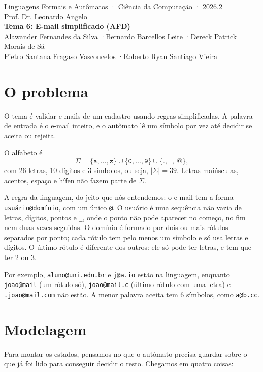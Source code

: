 \documentclass[11pt,a4paper]{article}
\newcommand{\s}[1]{\texttt{#1}}
\begin{document}
\begin{center}
{\small Linguagens Formais e Autômatos · Ciência da Computação · 2026.2}\\[2pt]
{\small Prof. Dr. Leonardo Angelo}\\[10pt]
{\sffamily\LARGE\bfseries Tema 6: E-mail simplificado (AFD)}\\[10pt]
Alawander Fernandes da Silva \quad·\quad Bernardo Barcellos Leite \quad·\quad Dereck Patrick Morais de Sá\\[3pt]
Pietro Santana Fragaso Vasconcelos \quad·\quad Roberto Ryan Santiago Vieira
\end{center}
\vspace{4pt}

\section{O problema}

O tema é validar e-mails de um cadastro usando regras simplificadas. A palavra de entrada é o
e-mail inteiro, e o autômato lê um símbolo por vez até decidir se aceita ou rejeita.

O alfabeto é
\[
\Sigma = \{\s{a},\dots,\s{z}\} \cup \{\s{0},\dots,\s{9}\} \cup \{\s{.},\ \s{\_},\ \s{@}\},
\]
com 26 letras, 10 dígitos e 3 símbolos, ou seja, $|\Sigma| = 39$. Letras maiúsculas, acentos,
espaço e hífen não fazem parte de $\Sigma$.

A regra da linguagem, do jeito que nós entendemos: o e-mail tem a forma \s{usuário@domínio}, com um
único \s{@}. O usuário é uma sequência não vazia de letras, dígitos, pontos e \s{\_}, onde o ponto
não pode aparecer no começo, no fim nem duas vezes seguidas. O domínio é formado por dois ou mais
rótulos separados por ponto; cada rótulo tem pelo menos um símbolo e só usa letras e dígitos. O último
rótulo é diferente dos outros: ele só pode ter letras, e tem que ter 2 ou 3.

Por exemplo, \s{aluno@uni.edu.br} e \s{j@a.io} estão na linguagem, enquanto \s{joao@mail} (um rótulo só),
\s{joao@mail.c} (último rótulo com uma letra) e \s{.joao@mail.com} não estão. A menor palavra aceita tem
6 símbolos, como \s{a@b.cc}.

\section{Modelagem}

Para montar os estados, pensamos no que o autômato precisa guardar sobre o que já foi lido para
conseguir decidir o resto. Chegamos em quatro coisas:
\end{document}
